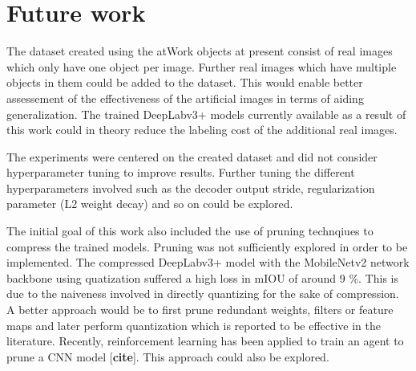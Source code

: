 \section{Future work}

The dataset created using the atWork objects at present consist of real images which only have one object per image. Further real images which have multiple objects in them could be added to the dataset. This would enable better assessement of the effectiveness of the artificial images in terms of aiding generalization. The trained DeepLabv3+ models currently available as a result of this work could in theory reduce the labeling cost of the additional real images. 

The experiments were centered on the created dataset and did not consider hyperparameter tuning to improve results. Further tuning the different hyperparameters involved such as the decoder output stride, regularization parameter (L2 weight decay) and so on could be explored.

The initial goal of this work also included the use of pruning technqiues to compress the trained models. Pruning was not sufficiently explored in order to be implemented. The compressed DeepLabv3+ model with the MobileNetv2 network backbone using quatization suffered a high loss in mIOU of around 9 \%. This is due to the naiveness involved in directly quantizing for the sake of compression. A better approach would be to first prune redundant weights, filters or feature maps and later perform quantization which is reported to be effective in the literature. Recently, reinforcement learning has been applied to train an agent to prune a CNN model [\textbf{cite}]. This approach could also be explored.

